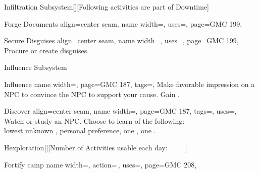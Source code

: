 \begin{PageFront}
\begin{Tables}{\frontTableHeight}
\begin{Table}{Infiltration Subsystem}[\;\dash\;][Following activities are part of Downtime]
\begin{entry}{Forge Documents}{%
                align=center seam,
                name width=\activityLength,%
                uses={\Society[tags=S]},
                page=GMC 199,
            }
            \end{entry}
            \begin{entry}{Secure Disguises}{%
                align=center seam,
                name width=\activityLength,%
                uses=,
                page=GMC 199,
            }
                Procure or create disguises. \\\phant
            \end{entry}
        \end{Table}
        \vfill
        \begin{Table}{Influence Subsystem}
            \begin{entry}{Influence}{%
                name width=\activityLength,%
                page=GMC 187,
                tags=\Concentrate\Linguistic,
            }
                Make favorable impression on a NPC to convince the NPC to support your cause.
                \hfill Gain  .
            \end{entry}
            \begin{entry}{Discover}{%
                align=center seam,
                name width=\activityLength,%
                page=GMC 187,
                tags=\Concentrate,
                uses={\Perception[tags=S]},
            }
                Watch or study an NPC.
                Choose to learn  of the following:  \hfill{}\\
                {lowest unknown  ,
                    \quad personal preference,
                    \quad one ,
                    \quad one .}
            \end{entry}
        \end{Table}
        \vfill
        \begin{Table}{Hexploration}[][Number of Activities usable each day:
        \quad\quad {}\,\Feet {}%
        \quad\quad {}\,\Feet {}%
        \quad\quad {}\,\Feet {}%
        \quad\quad {}\,\Feet {}%
        \quad\quad {}\,\Feet {}]
            \begin{entry}{Fortify camp}{%
                name width=\activityLength,%
                action=\,,
                uses=\Crafting,
                page=GMC 208,
            }

\end{entry}
\end{Table}
\end{Tables}
\end{PageFront}
